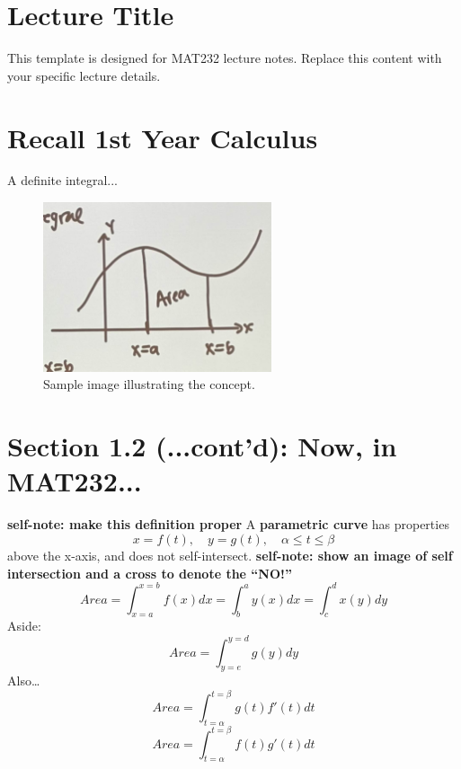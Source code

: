 \documentclass{article}
\begin{document}
\renewcommand{\familydefault}{\rmdefault}


\pagebreak
\normalsize

\section*{Lecture Title}
\begin{notebox}
This template is designed for MAT232 lecture notes. Replace this content with your specific lecture details.
\end{notebox}

\section*{Recall 1st Year Calculus}
\begin{definitionbox}
A definite integral...
\end{definitionbox}
\begin{figure}[H]
    \centering
    \includegraphics[width=0.6\textwidth]{1styearcalc.jpg}
    \caption{Sample image illustrating the concept.}
    \label{fig:sample_image}
\end{figure}

\section*{Section 1.2 (...cont'd): Now, in MAT232...}
\begin{definitionbox}
    \textbf{self-note: make this definition proper}
    A \textbf{parametric curve} has properties
    \[
        x = f(t), \quad y = g(t), \quad \alpha \leq t \leq \beta
    \]
    above the x-axis, and does not self-intersect.
    \textbf{self-note: show an image of self intersection and a cross to denote the ``NO!''}
    \[
        Area = \int_{x=a}^{x=b} f(x) dx = \int_{b}^{a} y(x) dx = \int_{c}^{d} x(y) dy
    \]
    Aside:
    \[
        Area = \int_{y=e}^{y=d} g(y) dy
    \]
    Also\dots
    \[
        Area = \int_{t=\alpha}^{t=\beta} g(t) f'(t) dt
    \]
    \[
        Area = \int_{t=\alpha}^{t=\beta} f(t) g'(t) dt
    \]
\end{definitionbox}
\end{document}
